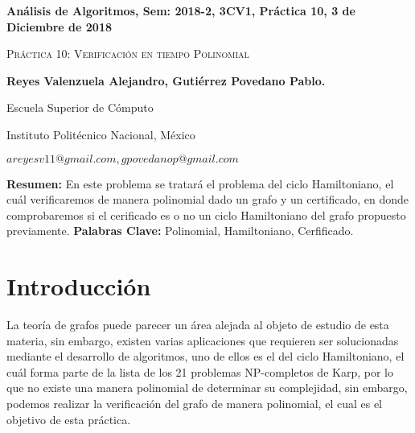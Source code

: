\documentclass[12pt,twoside]{article}
\date{}
\begin{document}
\centerline{\bf An\'alisis de Algoritmos, Sem: 2018-2, 3CV1, Pr\'actica 10, 3 de Diciembre de 2018}
\centerline{}
\centerline{}
\begin{center}
\Large{\textsc{Pr\'actica 10: Verificaci\'on en tiempo Polinomial}}
\end{center}
\centerline{}
\centerline{\bf {Reyes Valenzuela Alejandro, Guti\'errez Povedano Pablo.}}
\centerline{}
\centerline{Escuela Superior de C\'omputo}
\centerline{Instituto Polit\'ecnico Nacional, M\'exico}
\centerline{$areyesv11@gmail.com, gpovedanop@gmail.com$}
\newtheorem{Theorem}{\quad Theorem}[section]
\newtheorem{Definition}[Theorem]{\quad Definition}
\newtheorem{Corollary}[Theorem]{\quad Corollary}
\newtheorem{Lemma}[Theorem]{\quad Lemma}
\newtheorem{Example}[Theorem]{\quad Example}
\bigskip
\textbf{Resumen:} En este problema se tratar\'a el problema del ciclo Hamiltoniano, el cu\'al verificaremos de manera polinomial dado un grafo y un certificado, en donde comprobaremos si el cerificado es o no un ciclo Hamiltoniano del grafo propuesto previamente. 
{\bf Palabras Clave:} Polinomial, Hamiltoniano, Cerfificado.
\section{Introducci\'on}
La teor\'ia de grafos puede parecer un \'area alejada al objeto de estudio de esta materia, sin embargo, existen varias aplicaciones que requieren ser solucionadas mediante el desarrollo de algoritmos, uno de ellos es el del ciclo Hamiltoniano, el cu\'al forma parte de la lista de los 21 problemas NP-completos de Karp, por lo que no existe una manera polinomial de determinar su complejidad, sin embargo, podemos realizar la verificaci\'on del grafo de manera polinomial, el cual es el objetivo de esta pr\'actica.
\end{document}
